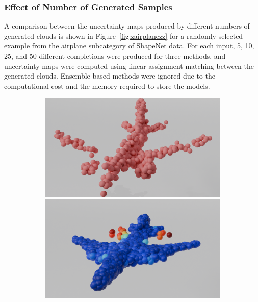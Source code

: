         \subsubsection{Effect of Number of Generated Samples}
        A comparison between the uncertainty maps produced by different numbers of generated clouds is shown in Figure~\ref{fig:zairplanezz} for a randomly selected example from the airplane subcategory of ShapeNet data. For each input, 5, 10, 25, and 50 different completions were produced for three methods, and uncertainty maps were computed using linear assignment matching between the generated clouds. Ensemble-based methods were ignored due to the computational cost and the memory required to store the models.
        \begin{figure}[htb]
          \centering
          \begin{subfigure}[t]{\textwidth+20pt\relax}
            \includegraphics[width=\dimexpr\linewidth-20pt\relax]{figures/part_ap.png}
            \includegraphics[width=\dimexpr\linewidth-20pt\relax]{figures/5z_ap_mcdc.png}

\end{subfigure}
\end{figure}
